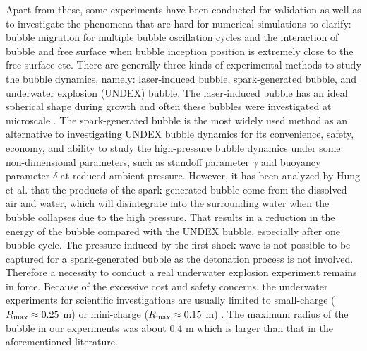 \documentclass[%
 aip,
 amsmath,amssymb,
 reprint,%
]{revtex4-1}
\begin{document}
Apart from these, some experiments have been conducted for validation \citep{RN2621,RN2614,RN2618,RN2628} as well as to investigate the phenomena that are hard for numerical simulations to clarify: bubble migration for multiple bubble oscillation cycles \citep{RN2495} and the interaction of bubble and free surface when bubble inception position is extremely close to the free surface \citep{RN2632} etc. There are generally three kinds of experimental methods to study the bubble dynamics, namely: laser-induced bubble\citep{RN3015}, spark-generated bubble\citep{RN2608}, and underwater explosion (UNDEX) bubble\citep{RN33}. The laser-induced bubble has an ideal spherical shape during growth and often these bubbles were investigated at microscale \citep{RN2737}. The spark-generated bubble \citep{RN2625} is the most widely used method as an alternative to investigating UNDEX bubble dynamics for its convenience, safety, economy, and ability to study the high-pressure bubble dynamics under some non-dimensional parameters, such as standoff parameter $\gamma$ and buoyancy parameter $\delta$ at reduced ambient pressure. However, it has been analyzed by Hung et al.\cite{RN2603} that the products of the spark-generated bubble come from the dissolved air and water, which will disintegrate into the surrounding water when the bubble collapses due to the high pressure. That results in a reduction in the energy of the bubble compared with the UNDEX bubble, especially after one bubble cycle. The pressure induced by the first shock wave is not possible to be captured for a spark-generated bubble as the detonation process is not involved. Therefore a necessity to conduct a real underwater explosion experiment remains in force. Because of the excessive cost and safety concerns, the underwater experiments for scientific investigations are usually limited to small-charge  ($R_{\rm max}\approx 0.25$ m) \citep{RN33,RN2618} or mini-charge ($R_{\rm max}\approx 0.15$ m) \citep{RN2603,RN2641}. The maximum radius of the bubble in our experiments was about 0.4 m which is larger than that in the aforementioned  literature.
\end{document}
